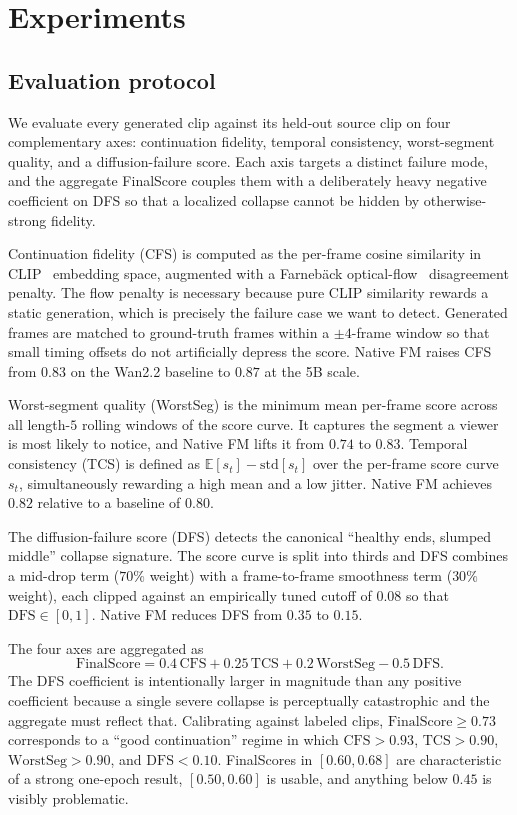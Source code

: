 \documentclass[10pt,twocolumn]{article}
\begin{document}
\section{Experiments}

\subsection{Evaluation protocol}\label{sec:eval}

We evaluate every generated clip against its held-out source clip on four complementary axes: continuation fidelity, temporal consistency, worst-segment quality, and a diffusion-failure score. Each axis targets a distinct failure mode, and the aggregate FinalScore couples them with a deliberately heavy negative coefficient on DFS so that a localized collapse cannot be hidden by otherwise-strong fidelity.

Continuation fidelity (CFS) is computed as the per-frame cosine similarity in CLIP~\cite{radford2021learning} embedding space, augmented with a Farneb\"ack optical-flow~\cite{farneback2003two} disagreement penalty. The flow penalty is necessary because pure CLIP similarity rewards a static generation, which is precisely the failure case we want to detect. Generated frames are matched to ground-truth frames within a $\pm 4$-frame window so that small timing offsets do not artificially depress the score. Native FM raises CFS from $0.83$ on the Wan2.2 baseline to $0.87$ at the 5B scale.

Worst-segment quality (WorstSeg) is the minimum mean per-frame score across all length-$5$ rolling windows of the score curve. It captures the segment a viewer is most likely to notice, and Native FM lifts it from $0.74$ to $0.83$. Temporal consistency (TCS) is defined as $\mathbb{E}[s_t] - \mathrm{std}[s_t]$ over the per-frame score curve $s_t$, simultaneously rewarding a high mean and a low jitter. Native FM achieves $0.82$ relative to a baseline of $0.80$.

The diffusion-failure score (DFS) detects the canonical ``healthy ends, slumped middle'' collapse signature. The score curve is split into thirds and DFS combines a mid-drop term ($70\%$ weight) with a frame-to-frame smoothness term ($30\%$ weight), each clipped against an empirically tuned cutoff of $0.08$ so that $\mathrm{DFS} \in [0,1]$. Native FM reduces DFS from $0.35$ to $0.15$.

The four axes are aggregated as
\begin{equation}
\mathrm{FinalScore} = 0.4\,\mathrm{CFS} + 0.25\,\mathrm{TCS} + 0.2\,\mathrm{WorstSeg} - 0.5\,\mathrm{DFS}.
\label{eq:final-score}
\end{equation}
The DFS coefficient is intentionally larger in magnitude than any positive coefficient because a single severe collapse is perceptually catastrophic and the aggregate must reflect that. Calibrating against labeled clips, $\mathrm{FinalScore} \geq 0.73$ corresponds to a ``good continuation'' regime in which $\mathrm{CFS} > 0.93$, $\mathrm{TCS} > 0.90$, $\mathrm{WorstSeg} > 0.90$, and $\mathrm{DFS} < 0.10$. FinalScores in $[0.60, 0.68]$ are characteristic of a strong one-epoch result, $[0.50, 0.60]$ is usable, and anything below $0.45$ is visibly problematic.
\end{document}
